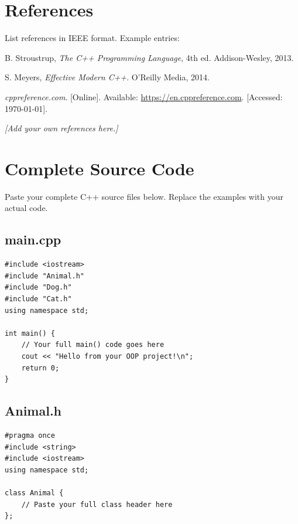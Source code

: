 \documentclass[11pt]{article}
\begin{document}
\newpage
\section*{References}

List references in IEEE format. Example entries:

\begin{enumerate}[label={[\arabic*]}]
    \item B. Stroustrup, \textit{The C++ Programming Language}, 4th ed. Addison-Wesley, 2013.
    \item S. Meyers, \textit{Effective Modern C++}. O'Reilly Media, 2014.
    \item \textit{cppreference.com}. [Online]. Available: \url{https://en.cppreference.com}. [Accessed: \today].
    \item \textit{[Add your own references here.]}
\end{enumerate}

\newpage
\appendix
\section{Complete Source Code}
\label{sec:code}

Paste your complete C++ source files below. Replace the examples with your actual code.

\subsection{main.cpp}
\begin{lstlisting}[caption={main.cpp --- entry point}]
#include <iostream>
#include "Animal.h"
#include "Dog.h"
#include "Cat.h"
using namespace std;

int main() {
    // Your full main() code goes here
    cout << "Hello from your OOP project!\n";
    return 0;
}
\end{lstlisting}

\subsection{Animal.h}
\begin{lstlisting}[caption={Animal.h --- base class header}]
#pragma once
#include <string>
#include <iostream>
using namespace std;

class Animal {
    // Paste your full class header here
};
\end{lstlisting}
\end{document}
